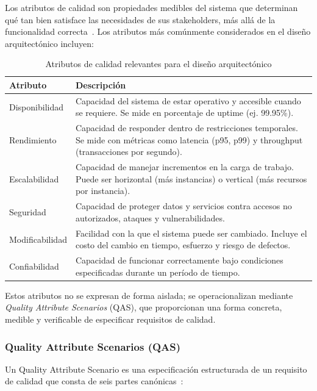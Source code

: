 \documentclass[12pt, letterpaper, oneside]{article}
\begin{document}
Los atributos de calidad son propiedades medibles del sistema que determinan qué
tan bien satisface las necesidades de sus stakeholders, más allá de la
funcionalidad correcta~\cite{bass2021software}. Los atributos más comúnmente
considerados en el diseño arquitectónico incluyen:

\begin{table}[H]
\centering
\caption{Atributos de calidad relevantes para el diseño arquitectónico}
\label{tab:quality-attributes}
\begin{tabularx}{\textwidth}{lX}
\toprule
\textbf{Atributo} & \textbf{Descripción} \\
\midrule
Disponibilidad & Capacidad del sistema de estar operativo y accesible cuando se requiere. Se mide en porcentaje de uptime (ej. 99.95\%). \\
Rendimiento & Capacidad de responder dentro de restricciones temporales. Se mide con métricas como latencia (p95, p99) y throughput (transacciones por segundo). \\
Escalabilidad & Capacidad de manejar incrementos en la carga de trabajo. Puede ser horizontal (más instancias) o vertical (más recursos por instancia). \\
Seguridad & Capacidad de proteger datos y servicios contra accesos no autorizados, ataques y vulnerabilidades. \\
Modificabilidad & Facilidad con la que el sistema puede ser cambiado. Incluye el costo del cambio en tiempo, esfuerzo y riesgo de defectos. \\
Confiabilidad & Capacidad de funcionar correctamente bajo condiciones especificadas durante un período de tiempo. \\
\bottomrule
\end{tabularx}
\end{table}

Estos atributos no se expresan de forma aislada; se operacionalizan mediante
\emph{Quality Attribute Scenarios} (QAS), que proporcionan una forma concreta,
medible y verificable de especificar requisitos de calidad.

\subsubsection{Quality Attribute Scenarios (QAS)}

Un Quality Attribute Scenario es una especificación estructurada de un requisito
de calidad que consta de seis partes canónicas~\cite{bass2021software}:
\end{document}
